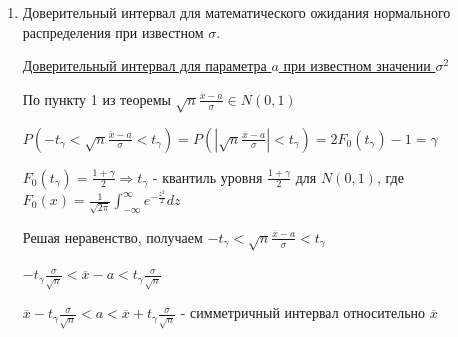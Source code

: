 \documentclass[12pt]{article}
\begin{document}
\begin{enumerate}
    \Def \hyperlink{interval_estimation}{Интервал} $(\theta^-_\gamma; \theta^+_\gamma)$ называется доверительным интервалом параметра $\theta$
    надежности $\gamma$, если вероятность $P(\theta^-_\gamma < \theta < \theta^+_\gamma) = \gamma$
    
    \Nota Если имеем дискретную случайную величину, то $P(\theta^-_\gamma < \theta < \theta^+_\gamma) \geq \gamma$
    
    \Notas Так как параметр $\theta$ - константа, то бессмысленно говорить о его попадании в интервал. Правильно: 
    доверительный интервал накрывает параметр $\theta$ с вероятностью $\gamma$
    
     $\alpha = 1 - \gamma$ называется уровнем значимости доверительного интервала
    
     Обычно пытаются строить симметричный доверительный интервал относительно несмещенной оценки $\theta^*$
    
     Возникает вопрос, какой уровень $\gamma$ выбрать для исследования.
    Стандартные уровени надежности $\gamma$: $0.9, \ 0.95, \ 0.99, \ 0.999$. Самый мейнстримный - $0.95$. 
    В малых выборках используют $0.9$

    \item Доверительный интервал для математического ожидания нормального распределения при известном $\sigma$.

    \hyperlink{confidence_interval_for_a_known_sigma}{Доверительный интервал для параметра $a$ при известном значении $\sigma^2$}

    По пункту 1 из теоремы $\sqrt{n} \frac{\overline{x} - a}{\sigma} \in N(0, 1)$ 

    $P\left(-t_\gamma < \sqrt{n} \frac{\overline{x} - a}{\sigma} < t_\gamma\right) = 
    P\left(\left|\sqrt{n} \frac{\overline{x} - a}{\sigma}\right| < t_\gamma\right) = 2F_0 (t_\gamma) - 1 = \gamma$

    $F_0(t_\gamma) = \frac{1 + \gamma}{2} \Longrightarrow t_\gamma$ - квантиль уровня 
    $\frac{1 + \gamma}{2}$ для $N(0, 1)$, где
    $F_0(x) = \frac{1}{\sqrt{2\pi}} \int_{-\infty}^{\infty} e^{-\frac{z^2}{2}} dz$

    Решая неравенство, получаем $-t_\gamma < \sqrt{n} \frac{\overline{x} - a}{\sigma} < t_\gamma$

    $-t_\gamma \frac{\sigma}{\sqrt{n}} < \overline{x} - a < t_\gamma \frac{\sigma}{\sqrt{n}}$

    $\overline{x} - t_\gamma \frac{\sigma}{\sqrt{n}} < a < \overline{x} + t_\gamma \frac{\sigma}{\sqrt{n}}$ - 
    симметричный интервал относительно $\overline{x}$


\end{enumerate}
\end{document}
